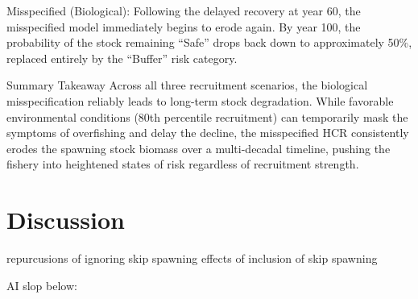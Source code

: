 \documentclass[
  authoryear,
  preprint,
  3p]{elsarticle}
\begin{document}
Misspecified (Biological): Following the delayed recovery at year 60,
the misspecified model immediately begins to erode again. By year 100,
the probability of the stock remaining ``Safe'' drops back down to
approximately 50\%, replaced entirely by the ``Buffer'' risk category.

Summary Takeaway Across all three recruitment scenarios, the biological
misspecification reliably leads to long-term stock degradation. While
favorable environmental conditions (80th percentile recruitment) can
temporarily mask the symptoms of overfishing and delay the decline, the
misspecified HCR consistently erodes the spawning stock biomass over a
multi-decadal timeline, pushing the fishery into heightened states of
risk regardless of recruitment strength.

\section{Discussion}\label{discussion}

repurcusions of ignoring skip spawning effects of inclusion of skip
spawning

AI slop below:
\end{document}
